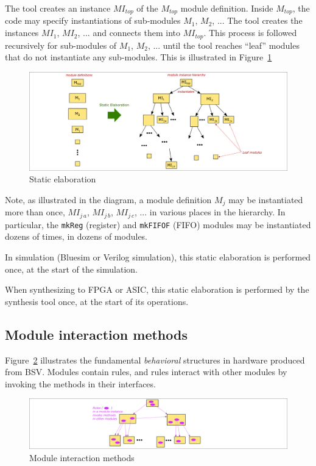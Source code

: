 The tool creates an instance $MI_{top}$ of the $M_{top}$ module
definition. Inside $M_{top}$, the code may specify instantiations of
sub-modules $M_1$, $M_2$, ...  The tool creates the instances $MI_1$,
$MI_2$, ...  and connects them into $MI_{top}$.  This process is
followed recursively for sub-modules of $M_1$, $M_2$, ... until the
tool reaches ``leaf'' modules that do not instantiate any sub-modules.
This is illustrated in Figure~\ref{Fig_BSV_static_elaboration}
\begin{figure}[htbp]
  \centerline{\includegraphics[width=6in,angle=0]{Figures/Fig_BSV_static_elaboration}}
  \caption{\label{Fig_BSV_static_elaboration} Static elaboration}
\end{figure}

Note, as illustrated in the diagram, a module definition $M_j$ may be
instantiated more than once, $MI_{j\,a}$, $MI_{j\,b}$, $MI_{j\,c}$,
... in various places in the hierarchy.  In particular, the
\verb|mkReg| (register) and \verb|mkFIFOF| (FIFO) modules may be
instantiated dozens of times, in dozens of modules.

In simulation (Bluesim or Verilog simulation), this static elaboration
is performed once, at the start of the simulation.

When synthesizing to FPGA or ASIC, this static elaboration is
performed by the synthesis tool once, at the start of its operations.


\subsection{Module interaction {\via} methods}

\label{Sec_module_interaction_via_methods}


Figure~\ref{Fig_BSV_module_interaction} illustrates the fundamental
\emph{behavioral} structures in hardware produced from BSV.  Modules
contain rules, and rules interact with other modules by invoking the
methods in their interfaces.
\begin{figure}[htbp]
  \centerline{\includegraphics[width=6in,angle=0]{Figures/Fig_BSV_module_interaction}}
  \caption{\label{Fig_BSV_module_interaction}
           Module interaction {\via} methods}
\end{figure}

